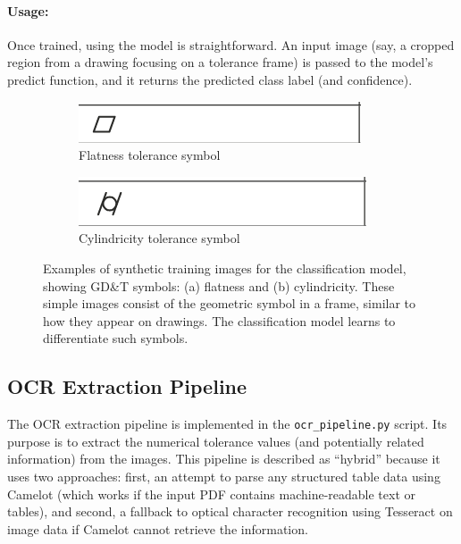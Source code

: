 \documentclass[11pt,a4paper]{article}
\begin{document}
\paragraph{Usage:} Once trained, using the model is straightforward. An input image (say, a cropped region from a drawing focusing on a tolerance frame) is passed to the model’s predict function, and it returns the predicted class label (and confidence). 

\begin{figure}[h!]
\centering
\begin{subfigure}{0.45\textwidth}
  \centering
  \includegraphics[width=\textwidth, trim=0 0 0 0, clip]{form_flatness.png}
  \caption{Flatness tolerance symbol}
\end{subfigure}\hfill
\begin{subfigure}{0.45\textwidth}
  \centering
  \includegraphics[width=\textwidth, trim=0 0 0 0, clip]{form_cylindricity.png}
  \caption{Cylindricity tolerance symbol}
\end{subfigure}
\caption{Examples of synthetic training images for the classification model, showing GD\&T symbols: (a) flatness and (b) cylindricity. These simple images consist of the geometric symbol in a frame, similar to how they appear on drawings. The classification model learns to differentiate such symbols.}
\label{fig:synthetic_samples}
\end{figure}

\subsection{OCR Extraction Pipeline}
The OCR extraction pipeline is implemented in the \verb|ocr_pipeline.py| script. Its purpose is to extract the numerical tolerance values (and potentially related information) from the images. This pipeline is described as “hybrid” because it uses two approaches: first, an attempt to parse any structured table data using Camelot (which works if the input PDF contains machine-readable text or tables), and second, a fallback to optical character recognition using Tesseract on image data if Camelot cannot retrieve the information.
\end{document}
